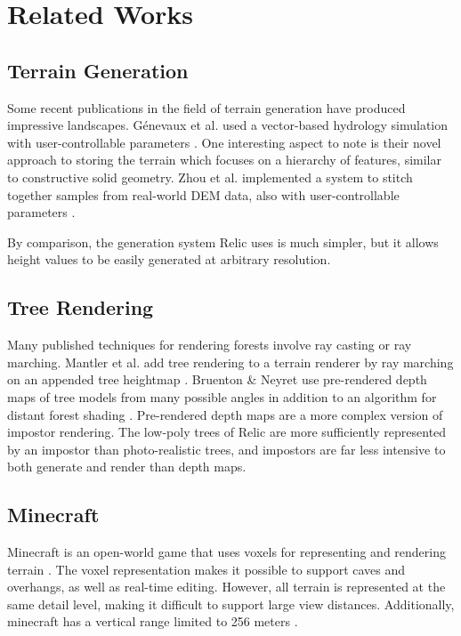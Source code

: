
\chapter{Related Works} \label{rworks}

\section{Terrain Generation}

Some recent publications in the field of terrain generation have produced impressive landscapes.
G{\'e}nevaux et al. used a vector-based hydrology simulation with user-controllable parameters \cite{hydrology}.
One interesting aspect to note is their novel approach to storing the terrain which focuses on a hierarchy of features, similar to constructive solid geometry.
Zhou et al. implemented a system to stitch together samples from real-world DEM data, also with user-controllable parameters \cite{DEMsynthesis}.

By comparison, the generation system Relic uses is much simpler, but it allows height values to be easily generated at arbitrary resolution.

\section{Tree Rendering}

Many published techniques for rendering forests involve ray casting or ray marching.
Mantler et al. add tree rendering to a terrain renderer by ray marching on an appended tree heightmap \cite{terraintreecast}.
Bruenton \& Neyret use pre-rendered depth maps of tree models from many possible angles in addition to an algorithm for distant forest shading \cite{bruneton_trees}.
Pre-rendered depth maps are a more complex version of impostor rendering.
The low-poly trees of Relic are more sufficiently represented by an impostor than photo-realistic trees, and impostors are far less intensive to both generate and render than depth maps.

\section{Minecraft}

Minecraft is an open-world game that uses voxels for representing and rendering terrain \cite{word_of_notch}.
The voxel representation makes it possible to support caves and overhangs, as well as real-time editing.
However, all terrain is represented at the same detail level, making it difficult to support large view distances.
Additionally, minecraft has a vertical range limited to 256 meters \cite{minecraft_altitude}.











